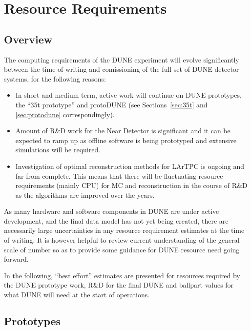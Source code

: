 \section{Resource Requirements}
\label{sec:resource-requirements}
\subsection{Overview}
The computing requirements of the DUNE experiment will evolve significantly between the time of writing
and comissioning of the full set of DUNE detector systems, for the following reasons:
\begin{itemize}
\item In short and medium term, active work will continue on DUNE prototypes, the ``35t prototype'' and protoDUNE
(see Sections~\ref{sec:35t} and \ref{sec:protodune} correspondingly).

\item Amount of R\&D work for the Near Detector is significant and it can be expected to ramp up as offline software
is being prototyped and extensive simulations will be required.

\item Investigation of optimal reconstruction methods for LArTPC is ongoing and far from complete. This means
that there will be fluctuating resource requirements (mainly CPU) for MC and reconstruction in the course of R\&D
as the algorithms are improved over the years.

\end{itemize}

\noindent
As many hardware and software components in DUNE are under active development,
and the final data model has not yet being created, there are necessarily large uncertainties in any resource requirement estimates
at the time of writing. It is however helpful to review current understanding of the general scale of number so as to provide some
guidance for DUNE resource need going forward.

In the following, ``best effort'' estimates are presented for resources required by the DUNE prototype work,  R\&D for the final DUNE
and ballpart values for what DUNE will need at the start of operations.

\subsection{Prototypes}
